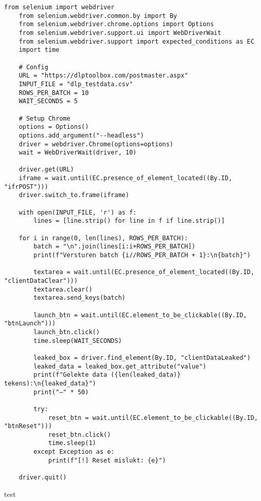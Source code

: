\begin{lstlisting}[style=custompython,caption={Selenium-script voor batchgewijze verzending van testdata},label={lst:dlp-script}]
    from selenium import webdriver
    from selenium.webdriver.common.by import By
    from selenium.webdriver.chrome.options import Options
    from selenium.webdriver.support.ui import WebDriverWait
    from selenium.webdriver.support import expected_conditions as EC
    import time
    
    # Config
    URL = "https://dlptoolbox.com/postmaster.aspx"
    INPUT_FILE = "dlp_testdata.csv"
    ROWS_PER_BATCH = 10
    WAIT_SECONDS = 5
    
    # Setup Chrome
    options = Options()
    options.add_argument("--headless")
    driver = webdriver.Chrome(options=options)
    wait = WebDriverWait(driver, 10)
    
    driver.get(URL)
    iframe = wait.until(EC.presence_of_element_located((By.ID, "ifrPOST")))
    driver.switch_to.frame(iframe)
    
    with open(INPUT_FILE, 'r') as f:
        lines = [line.strip() for line in f if line.strip()]
    
    for i in range(0, len(lines), ROWS_PER_BATCH):
        batch = "\n".join(lines[i:i+ROWS_PER_BATCH])
        print(f"Versturen batch {i//ROWS_PER_BATCH + 1}:\n{batch}")
    
        textarea = wait.until(EC.presence_of_element_located((By.ID, "clientDataClear")))
        textarea.clear()
        textarea.send_keys(batch)
    
        launch_btn = wait.until(EC.element_to_be_clickable((By.ID, "btnLaunch")))
        launch_btn.click()
        time.sleep(WAIT_SECONDS)
    
        leaked_box = driver.find_element(By.ID, "clientDataLeaked")
        leaked_data = leaked_box.get_attribute("value")
        print(f"Gelekte data ({len(leaked_data)} tekens):\n{leaked_data}")
        print("—" * 50)
    
        try:
            reset_btn = wait.until(EC.element_to_be_clickable((By.ID, "btnReset")))
            reset_btn.click()
            time.sleep(1)
        except Exception as e:
            print(f"[!] Reset mislukt: {e}")
    
    driver.quit()
\end{lstlisting}

test

